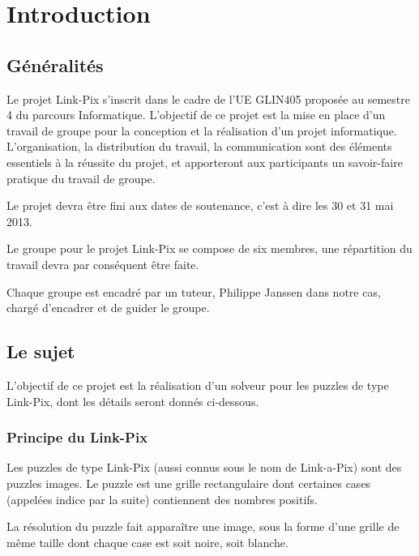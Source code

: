 \chapter{Introduction}
  \section{Généralités}

Le projet Link-Pix s'inscrit dans le cadre de l'UE GLIN405 proposée au semestre 4 du parcours Informatique.
L'objectif de ce projet est la mise en place d'un travail de groupe pour la conception et la réalisation d'un projet informatique.
L'organisation, la distribution du travail, la communication sont des éléments essentiels à la réussite du projet, et apporteront aux participants un savoir-faire pratique du travail de groupe.

Le projet devra être fini aux dates de soutenance, c'est à dire les 30 et 31 mai 2013.

Le groupe pour le projet Link-Pix se compose de six membres, une répartition du travail devra par conséquent être faite.

Chaque groupe est encadré par un tuteur, Philippe Janssen dans notre cas, chargé d'encadrer et de guider le groupe.

  \section{Le sujet}

L'objectif de ce projet est la réalisation d'un solveur pour les puzzles de type Link-Pix, dont les détails seront donnés ci-dessous.

    \subsection{Principe du Link-Pix}
Les puzzles de type Link-Pix (aussi connus sous le nom de Link-a-Pix) sont des puzzles images. Le puzzle est une grille rectangulaire dont certaines cases (appelées indice par la suite) contiennent des nombres positifs.

La résolution du puzzle fait apparaître une image, sous la forme d'une grille de même taille dont chaque case est soit noire, soit blanche.

